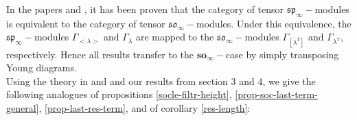 \documentclass[main.tex]{subfiles}
\begin{document}
In the papers \cite{dancohen2012koszulcategoryrepresentationsfinitary} 
and \cite{Serganova2017}, it has been proven that the category of tensor $\mathfrak{sp}_\infty-$modules is equivalent to the category of  tensor $\mathfrak{so}_\infty-$modules. Under this equivalence,  the $\mathfrak{sp}_\infty-$modules $\Gamma_{<\lambda>}$ and $\Gamma_\lambda$ are mapped to the $\mathfrak{so}_\infty-$modules $\Gamma_{[\lambda^T]}$ and $\Gamma_{\lambda^T}$, respectively. Hence all results transfer to the $\mathbf{so}_\infty-$case by simply transposing Young diagrams. \\

Using the theory in \cite{penkov2007tensorrepresentationsclassicallocally} and \cite{SAM_2015} and our results from section 3 and 4, we give the following analogues of propositions \ref{socle-filtr-height}, \ref{prop-soc-last-term-general}, \ref{prop-last-res-term}, and of corollary \ref{res-length}: 
\end{document}
